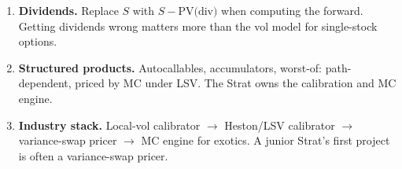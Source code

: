 \begin{keyfactbox}
\begin{enumerate}
  \item \textbf{Dividends.}
    Replace $S$ with $S - \text{PV(div)}$ when computing the forward.
    Getting dividends wrong matters more than the vol model for
    single-stock options.

  \item \textbf{Structured products.}
    Autocallables, accumulators, worst-of: path-dependent, priced by
    MC under LSV.  The Strat owns the calibration and MC engine.

  \item \textbf{Industry stack.}
    Local-vol calibrator $\to$ Heston/LSV calibrator $\to$
    variance-swap pricer $\to$ MC engine for exotics.  A junior
    Strat's first project is often a variance-swap pricer.
\end{enumerate}
\end{keyfactbox}
